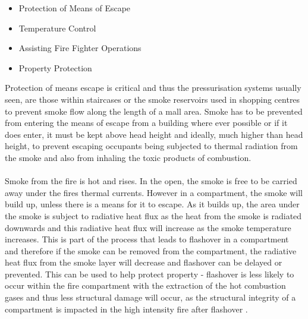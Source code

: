 \documentclass[table,a4paper,oneside]{book}
\begin{document}
\begin{itemize}
\item Protection of Means of Escape
\item Temperature Control
\item Assisting Fire Fighter Operations
\item Property Protection
\end{itemize}
Protection of means escape is critical and thus the pressurisation systems usually seen, are those within staircases or the smoke reservoirs used in shopping centres to prevent smoke flow along the length of a mall area. Smoke has to be prevented from entering the means of escape from a building where ever possible or if it does enter, it must be kept above head height and ideally, much higher than head height, to prevent escaping occupants being subjected to thermal radiation from the smoke and also from inhaling the toxic products of combustion.
\\
\\
Smoke from the fire is hot and rises. In the open, the smoke is free to be carried away under the fires thermal currents. However in a compartment, the smoke will build up, unless there is a means for it to escape. As it builds up, the area under the smoke is subject to radiative heat flux as the heat from the smoke is radiated downwards and this radiative heat flux will increase as the smoke temperature increases. This is part of the process that leads to flashover in a compartment \citep{Drysdale1998} and therefore if the smoke can be removed from the compartment, the radiative heat flux from the smoke layer will decrease and flashover can be delayed or prevented. This can be used to help protect property - flashover is less likely to occur within the fire compartment with the extraction of the hot combustion gases and thus less structural damage will occur, as the structural integrity of a compartment is impacted in the high intensity fire after flashover \citep{Ramachandran1990}.
\end{document}

